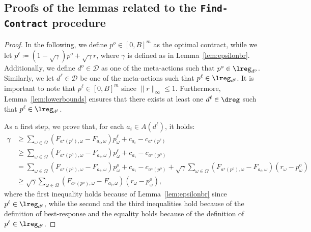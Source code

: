 \subsection{Proofs of the lemmas related to the \texttt{Find-Contract} procedure}\label{sec:app_fiind_contr}

\epsilonsolution*
\begin{proof}
	In the following, we define $p^o \in [0,B]^m$ as the optimal contract, while we let $p^{\ell} \coloneqq (1-\sqrt{\gamma})p^o + \sqrt{\gamma} r$, where $\gamma$ is defined as in Lemma~\ref{lem:epsilonbr}. Additionally, we define $d^o \in \mathcal{D}$ as one of the meta-actions such that $p^o \in \lreg_{d^o}$. Similarly, we let $d^\ell \in \mathcal{D}$ be one of the meta-actions such that $p^\ell \in \lreg_{d^\ell}$. It is important to note that $p^\ell \in [0,B]^m$ since $\|r\|_{\infty} \le 1$. Furthermore, Lemma~\ref{lem:lowerbounds} ensures that there exists at least one $d^\ell \in \dreg$ such that $p^\ell \in \lreg_{d^\ell}$.
	
	As a first step, we prove that, for each $a_i \in A(d^\ell)$, it holds:
	\begin{align}
		\gamma & \ge \sum_{\omega \in \Omega }(F_{a^\star(p^\ell),\omega} - F_{a_i,\omega} ) p^\ell_\omega + c_{a_i}- c_{a^\star(p^\ell)} \nonumber \\
		& \ge \sum_{\omega \in \Omega }(F_{a^\star(p^o),\omega} - F_{a_i,\omega} ) p^\ell_\omega + c_{a_i}- c_{a^\star(p^o)} \nonumber  \\
		& = \sum_{\omega \in \Omega }(F_{a^\star(p^o),\omega} - F_{a_i,\omega} ) p^o_\omega  + c_{a_i}- c_{a^\star(p^o)} + \sqrt{\gamma} \sum_{\omega \in \Omega } (F_{a^\star(p^o),\omega} - F_{a_i,\omega} ) ( r_\omega - p^o_\omega ) \nonumber \\
		& \ge \sqrt{\gamma} \sum_{\omega \in \Omega } (F_{a^\star(p^o),\omega} - F_{a_i,\omega} ) ( r_\omega - p^o_\omega ) \nonumber ,
	\end{align}
	 where the first inequality holds because of Lemma~\ref{lem:epsilonbr} since $p^\ell \in \lreg_{d^\ell}$, while the second and the third inequalities hold because of the definition of best-response and the equality holds because of the definition of $p^\ell \in \lreg_{d^\ell}$.
	 

\end{proof}
